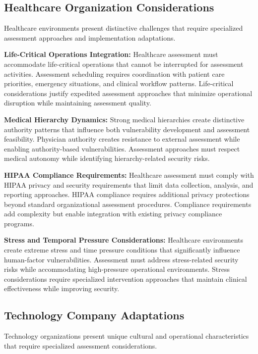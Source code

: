 \documentclass[10pt, twocolumn]{article}
\begin{document}
\subsection{Healthcare Organization Considerations}

Healthcare environments present distinctive challenges that require specialized assessment approaches and implementation adaptations.

\textbf{Life-Critical Operations Integration:} Healthcare assessment must accommodate life-critical operations that cannot be interrupted for assessment activities. Assessment scheduling requires coordination with patient care priorities, emergency situations, and clinical workflow patterns. Life-critical considerations justify expedited assessment approaches that minimize operational disruption while maintaining assessment quality.

\textbf{Medical Hierarchy Dynamics:} Strong medical hierarchies create distinctive authority patterns that influence both vulnerability development and assessment feasibility. Physician authority creates resistance to external assessment while enabling authority-based vulnerabilities. Assessment approaches must respect medical autonomy while identifying hierarchy-related security risks.

\textbf{HIPAA Compliance Requirements:} Healthcare assessment must comply with HIPAA privacy and security requirements that limit data collection, analysis, and reporting approaches. HIPAA compliance requires additional privacy protections beyond standard organizational assessment procedures. Compliance requirements add complexity but enable integration with existing privacy compliance programs.

\textbf{Stress and Temporal Pressure Considerations:} Healthcare environments create extreme stress and time pressure conditions that significantly influence human-factor vulnerabilities. Assessment must address stress-related security risks while accommodating high-pressure operational environments. Stress considerations require specialized intervention approaches that maintain clinical effectiveness while improving security.

\subsection{Technology Company Adaptations}

Technology organizations present unique cultural and operational characteristics that require specialized assessment considerations.
\end{document}
